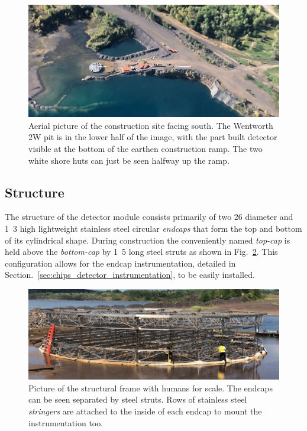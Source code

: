 \begin{figure} %
    \includegraphics[width=\textwidth]{diagrams/4-chips/from_the_air.pdf}
    \caption[Aerial picture of the \chipsfive construction site]
    {Aerial picture of the \chipsfive construction site facing south. The Wentworth 2W pit is in
        the lower half of the image, with the part built \chipsfive detector visible at the bottom
        of the earthen construction ramp. The two white shore huts can just be seen halfway up the
        ramp.}
    \label{fig:from_the_sky}
\end{figure}

\subsection{Structure} %
\label{sec:chips_detector_structure} %

The structure of the \chipsfive detector module consists primarily of two \unit{26}{}
diameter and \unit{1.3}{} high lightweight stainless steel circular \emph{endcaps} that
form the top and bottom of its cylindrical shape. During construction the conveniently named
\emph{top-cap} is held above the \emph{bottom-cap} by \unit{1.5}{} long steel struts as
shown in Fig.~\ref{fig:frame}. This configuration allows for the endcap instrumentation, detailed
in Section.~\ref{sec:chips_detector_instrumentation}, to be easily installed.

\begin{figure} %
    \includegraphics[width=\textwidth]{diagrams/4-chips/frame.pdf}
    \caption[Picture of the \chipsfive structural frame]
    {Picture of the \chipsfive structural frame with humans for scale. The endcaps can be seen
        separated by steel struts. Rows of stainless steel \emph{stringers} are attached to the
        inside of each endcap to mount the instrumentation too.}
    \label{fig:frame}
\end{figure}

